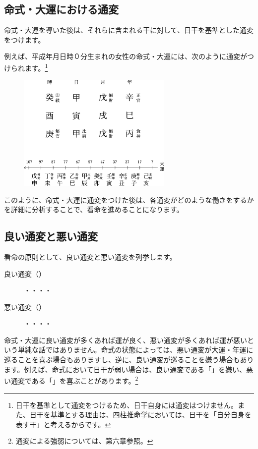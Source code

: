 \documentclass[a5paper,11pt,dvipdfmx]{tarticle}
\begin{document}
\subsection{命式・大運における通変}
命式・大運を導いた後は、それらに含まれる干に対して、日干を基準とした通変をつけます。

例えば、平成年月日時０分生まれの女性の命式・大運には、次のように通変がつけられます。\footnote{日干を基準として通変をつけるため、日干自身には通変はつけません。また、日干を基準とする理由は、四柱推命学においては、日干を「自分自身を表す干」と考えるからです。}

\begin{figure}[h]
  \includegraphics[width=75mm,angle=90]{figs/figure5-7.eps}
\end{figure}

このように、命式・大運に通変をつけた後は、各通変がどのような働きをするかを詳細に分析することで、看命を進めることになります。

\subsection{良い通変と悪い通変}
看命の原則として、良い通変と悪い通変を列挙します。
\begin{description}
\item[良い通変（）] ・・・・
\item[悪い通変（）] ・・・・
\end{description}
  
命式・大運に良い通変が多くあれば運が良く、悪い通変が多くあれば運が悪いという単純な話ではありません。命式の状態によっては、悪い通変が大運・年運に巡ることを喜ぶ場合もありますし、逆に、良い通変が巡ることを嫌う場合もあります。例えば、命式において日干が弱い場合は、良い通変である「」を嫌い、悪い通変である「」を喜ぶことがあります。\footnote{通変による強弱については、第六章参照。}
\end{document}

